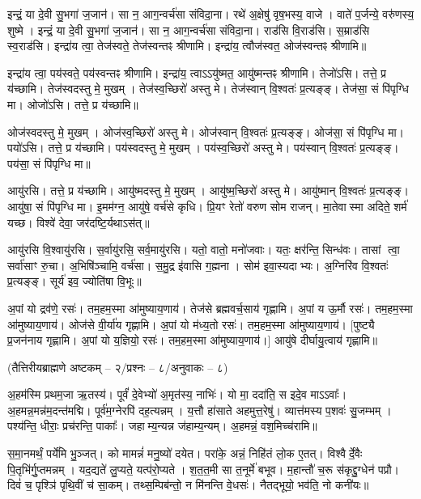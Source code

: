 इन्द्रं॒ या दे॒वी सु॒भगा॑ ज॒जान॑।
सा न॒ आग॒न्वर्च॑सा संविदा॒ना।
रथे॑ अ॒क्षेषु॑ वृष॒भस्य॒ वाजे।
वाते॑ प॒र्जन्ये॒ वरु॑णस्य॒ शुष्मे।
इन्द्रं॒ या दे॒वी सु॒भगा॑ ज॒जान॑।
सा न॒ आग॒न्वर्च॑सा संविदा॒ना।
राड॑सि वि॒राड॑सि।
स॒म्राड॑सि स्व॒राड॑सि।
इन्द्रा॑य त्वा॒ तेज॑स्वते॒ तेज॑स्वन्तꣴ श्रीणामि।
इन्द्रा॑य॒ त्वौज॑स्वत॒ ओज॑स्वन्तꣴ श्रीणामि॥

इन्द्रा॑य त्वा॒ पय॑स्वते॒ पय॑स्वन्तꣴ श्रीणामि।
इन्द्रा॑य॒ त्वाऽऽयु॑ष्मत॒ आयु॑ष्मन्तꣴ श्रीणामि।
तेजो॑ऽसि।
तत्ते॒ प्र य॑च्छामि।
तेज॑स्वदस्तु मे॒ मुखम्।
तेज॑स्व॒च्छिरो॑ अस्तु मे।
तेज॑स्वान् वि॒श्वतः॑ प्र॒त्यङ्ङ्।
तेज॑सा॒ सं पि॑पृग्धि मा।
ओजो॑ऽसि।
तत्ते॒ प्र य॑च्छामि॥

ओज॑स्वदस्तु मे॒ मुखम्।
ओज॑स्व॒च्छिरो॑ अस्तु मे।
ओज॑स्वान् वि॒श्वतः॑ प्र॒त्यङ्ङ्।
ओज॑सा॒ सं पि॑पृग्धि मा।
पयो॑ऽसि।
तत्ते॒ प्र य॑च्छामि।
पय॑स्वदस्तु मे॒ मुखम्।
पय॑स्व॒च्छिरो॑ अस्तु मे।
पय॑स्वान् वि॒श्वतः॑ प्र॒त्यङ्ङ्।
पय॑सा॒ सं पि॑पृग्धि मा॥

आयु॑रसि।
तत्ते॒ प्र य॑च्छामि।
आयु॑ष्मदस्तु मे॒ मुखम्।
आयु॑ष्म॒च्छिरो॑ अस्तु मे।
आयु॑ष्मान् वि॒श्वतः॑ प्र॒त्यङ्ङ्।
आयु॑षा॒ सं पि॑पृग्धि मा।
इ॒मम॑ग्न॒ आयु॑षे॒ वर्च॑से कृधि।
प्रि॒यꣳ रेतो॑ वरुण सोम राजन्।
मा॒तेवास्मा अदिते॒ शर्म॑ यच्छ।
विश्वे॑ देवा॒ जर॑दष्टि॒र्यथाऽस॑त्॥

आयु॑रसि वि॒श्वायु॑रसि।
स॒र्वायु॑रसि॒ सर्व॒मायु॑रसि।
यतो॒ वातो॒ मनो॑जवाः।
यतः॒ क्षर॑न्ति॒ सिन्ध॑वः।
तासां त्वा॒ सर्वा॑साꣳ रु॒चा।
अ॒भिषि॑ञ्चामि॒ वर्च॑सा।
स॒मु॒द्र इ॑वासि ग॒ह्मना।
सोम॑ इवा॒स्यदाभ्यः।
अ॒ग्निरि॑व वि॒श्वतः॑ प्र॒त्यङ्ङ्।
सूर्य॑ इव॒ ज्योति॑षा वि॒भूः॥


अ॒पां यो द्रव॑णे॒ रसः॑।
तम॒हम॒स्मा आ॑मुष्याय॒णाय॑।
तेज॑से ब्रह्मवर्च॒साय॑ गृह्णामि।
अ॒पां य ऊ॒र्मौ रसः॑।
तम॒हम॒स्मा आ॑मुष्याय॒णाय॑।
ओज॑से वी॒र्या॑य गृह्णामि।
अ॒पां यो म॑ध्य॒तो रसः॑।
तम॒हम॒स्मा आ॑मुष्याय॒णाय॑।
[पुष्ट्यै प्र॒जन॑नाय गृह्णामि।
अ॒पां यो य॒ज्ञियो॒ रसः॑।
तम॒हम॒स्मा आ॑मुष्याय॒णाय॑।]
आयु॑षे दीर्घायु॒त्वाय॑ गृह्णामि॥

\centerline{\normalsize (तैत्तिरीयब्राह्मणे अष्टकम् – २/प्रश्नः – ८/अनुवाकः – ८)}
अ॒हम॑स्मि प्रथम॒जा ऋ॒तस्य॑।
पूर्वं॑ दे॒वेभ्यो॑ अ॒मृत॑स्य॒ नाभिः॑।
यो मा॒ ददा॑ति॒ स इदे॒व माऽऽवाः᳚।
अ॒हमन्न॒मन्न॑म॒दन्त॑मद्मि।
पूर्व॑म॒ग्नेरपि॑ दह॒त्यन्नम्।
य॒त्तौ हा॑साते अहमुत्त॒रेषु॑।
व्यात्त॑मस्य प॒शवः॑ सु॒जम्भम्।
पश्य॑न्ति॒ धीराः॒ प्रच॑रन्ति॒ पाकाः᳚।
जहाम्य॒न्यन्न ज॑हाम्य॒न्यम्।
अ॒हमन्नं॒ वश॒मिच्च॑रामि॥

स॒मा॒नमर्थं॒ पर्ये॑मि भु॒ञ्जत्।
को मामन्नं॑ मनु॒ष्यो॑ दयेत।
परा॑के॒ अन्नं॒ निहि॑तं लो॒क ए॒तत्।
विश्वैर्दे॒वैः पि॒तृभि॑र्गु॒प्तमन्नम्।
यद॒द्यते॑ लु॒प्यते॒ यत्प॑रो॒प्यते।
श॒त॒त॒मी सा त॒नूर्मे॑ बभूव।
म॒हान्तौ॑ च॒रू स॑कृद्दु॒ग्धेन॑ पप्रौ।
दिवं॑ च॒ पृश्ञि॑ पृथि॒वीं च॑ सा॒कम्।
तथ्स॒म्पिब॑न्तो॒ न मि॑नन्ति वे॒धसः॑।
नैतद्भूयो॒ भव॑ति॒ नो कनी॑यः॥

